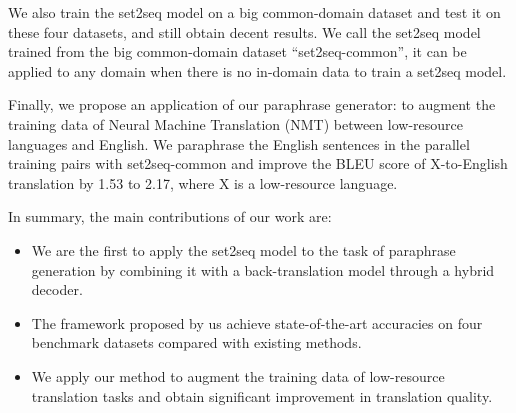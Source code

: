 
We also train the set2seq model on a big common-domain dataset and test it on these four datasets, and still obtain decent results. We call the set2seq model trained from the big common-domain dataset ``set2seq-common'', it can be applied to any domain when there is no in-domain data to train a set2seq model.


Finally, we propose an application of our paraphrase generator: 
to augment the training data of 
Neural Machine Translation (NMT) between low-resource languages and English. 
We paraphrase the English sentences in the parallel training pairs with set2seq-common and 
improve the BLEU score of X-to-English translation by 1.53 to 2.17, 
where X is a low-resource language.

In summary, the main contributions of our work are:
\begin{itemize}
\item We are the first to apply the set2seq model to the task of paraphrase generation by combining it with a back-translation model through a hybrid decoder.
\item The framework proposed by us achieve state-of-the-art accuracies on 
four benchmark datasets compared with existing methods.
\item We apply our method to augment the training data of low-resource
translation tasks and obtain significant improvement in translation quality.
\end{itemize}
